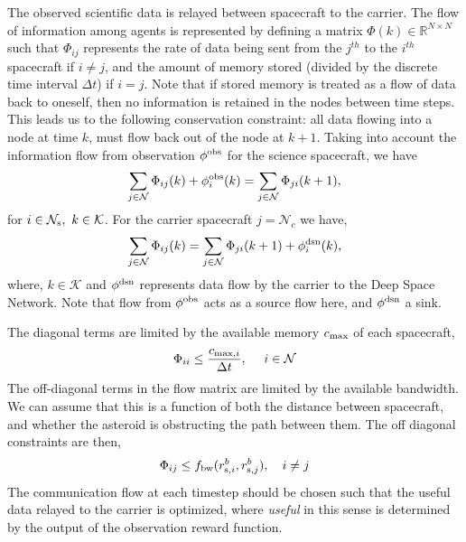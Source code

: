 \documentclass[letterpaper, 10 pt, conference]{ieeeconf}  %
\theoremstyle{definition}
\begin{document}
The observed scientific data is relayed between spacecraft to the carrier. The flow of information among agents is represented by defining a matrix $\Phi(k) \in \mathbb{R}^{N\times N}$ such that $\Phi_{ij}$ represents the rate of data being sent from the $j^{th}$ to the $i^{th}$ spacecraft if $i\not=j$, and the amount of memory stored (divided by the discrete time interval $\Delta t$) if $i=j$. Note that if stored memory is treated as a flow of data back to oneself, then no information is retained in the nodes between time steps. This leads us to the following conservation constraint: all data flowing into a node at time $k$, must flow back out of the node at $k+1$. Taking into account the information flow from observation $\phi^{\rm obs}$ for the science spacecraft, we have
\begin{equation} \label{eq: flow_conservation_sc}
    \sum_{j\in\mathcal{N}}\Phi_{ij}(k)+\phi^{\rm obs}_i(k) = \sum_{j\in \mathcal{N}}\Phi_{ji}(k+1),
\end{equation}
for $i\in\mathcal{N}_{\rm s},\,\,k\in\mathcal{K}$. For the carrier spacecraft $j=\mathcal{N}_c$ we have, 
\begin{equation} \label{eq: flow_conservation_carrier}
    \sum_{j\in\mathcal{N}}\Phi_{ij}(k)  = \sum_{j\in \mathcal{N}}\Phi_{ji}(k+1) + \phi^{\rm dsn}_i(k),
\end{equation}
where, $k\in\mathcal{K}$ and $\phi^{\rm dsn}$ represents data flow by the carrier to the Deep Space Network. 
Note that flow from $\phi^{\rm obs}$ acts as a source flow here, and $\phi^{\rm dsn}$ a sink. 

The diagonal terms are limited by the available memory $c_{\rm max}$ of each spacecraft, 
\begin{equation}
    \Phi_{ii} \leq \frac{c_{{\rm max},i}}{\Delta t}, \quad  \,\, i\in \mathcal{N}
\end{equation}
The off-diagonal terms in the flow matrix are limited by the available bandwidth. We can assume that this is a function of both the distance between spacecraft, and whether the asteroid is obstructing the path between them. The off diagonal constraints are then,  
\begin{equation}
    \Phi_{ij} \leq f_{\rm bw}(r^b_{{\rm s },i},r^b_{{\rm s },j}),\quad i\not=j
\end{equation}
The communication flow at each timestep should be chosen such that the useful data relayed to the carrier is optimized, where \textit{useful} in this sense is determined by the output of the observation reward function. 
\end{document}

